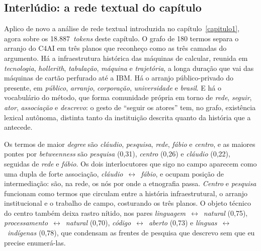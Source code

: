 %
%

\subsection*{Interlúdio: a rede textual do capítulo}

Aplico de novo a análise de rede textual introduzida no
capítulo~\ref{capitulo1}, agora sobre os 18.887~\textit{tokens}
deste capítulo. O grafo de 180 termos separa o arranjo do C4AI em três
planos que reconheço como as três camadas do argumento. Há a
infraestrutura histórica das máquinas de calcular, reunida em
\textit{tecnologia}, \textit{hollerith}, \textit{tabulação},
\textit{máquina} e \textit{trajetória}, a longa duração que vai das
máquinas de cartão perfurado até a IBM. Há o arranjo público-privado do
presente, em \textit{público}, \textit{arranjo}, \textit{corporação},
\textit{universidade} e \textit{brasil}. E há o vocabulário do método,
que forma comunidade própria em torno de \textit{rede}, \textit{seguir},
\textit{ator}, \textit{associação} e \textit{descrevo}: o gesto de
\enquote{seguir os atores} tem, no grafo, existência lexical autônoma,
distinta tanto da instituição descrita quanto da história que a
antecede.

Os termos de maior \textit{degree} são \textit{cláudio},
\textit{pesquisa}, \textit{rede}, \textit{fábio} e \textit{centro}, e as
maiores pontes por \textit{betweenness} são \textit{pesquisa}
(0,31), \textit{centro} (0,26) e \textit{cláudio}
(0,22), seguidas de \textit{rede} e \textit{fábio}. Os dois
interlocutores que sigo no campo aparecem como uma dupla de forte
associação, \textit{cláudio}~$\leftrightarrow$~\textit{fábio}, e ocupam
posição de intermediação: são, na rede, os nós por onde a etnografia
passa. \textit{Centro} e \textit{pesquisa} funcionam como termos que
circulam entre a história infraestrutural, o arranjo institucional e o
trabalho de campo, costurando os três planos. O objeto técnico do centro
também deixa rastro nítido, nos pares
\textit{linguagem}~$\leftrightarrow$~\textit{natural} (0,75),
\textit{processamento}~$\leftrightarrow$~\textit{natural} (0,70),
\textit{código}~$\leftrightarrow$~\textit{aberto} (0,73) e
\textit{línguas}~$\leftrightarrow$~\textit{indígenas} (0,78), que
condensam as frentes de pesquisa que descrevo sem que eu precise
enumerá-las.

